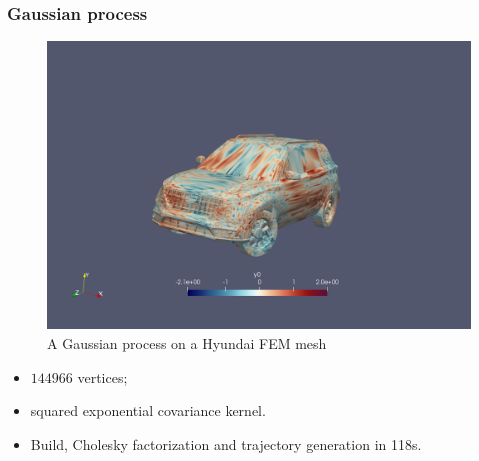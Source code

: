 \begin{frame}
\frametitle{Gaussian process}
\begin{figure}[H]
\begin{center}
  \includegraphics[scale=0.15]{./img/voiture}
  \caption{A Gaussian process on a Hyundai FEM mesh}
\end{center}
\end{figure}
\begin{itemize}
\item $144966$ vertices;
\item squared exponential covariance kernel.
\item Build, Cholesky factorization and trajectory generation in 118s.
\end{itemize}
\end{frame}
